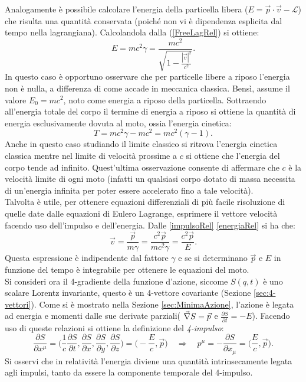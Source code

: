Analogamente è possibile calcolare l'energia della particella libera ($E = \vec{p}\cdot\vec{v}-\mathcal{L} $) che risulta una quantità conservata (poiché non vi è dipendenza esplicita dal tempo nella lagrangiana). Calcolandola dalla (\ref{FreeLagRel}) si ottiene:
\begin{equation}
    E = mc^2\gamma=\frac{mc^2}{\sqrt{1-\frac{|\vec{v}|^2}{c^2}}}.\label{energiaRel}
\end{equation}
In questo caso è opportuno osservare che per particelle libere a riposo l'energia non è nulla, a differenza di come accade in meccanica classica. Bensì, assume il valore $E_0=mc^2$, noto come energia a riposo della particella. Sottraendo all'energia totale del corpo il termine di energia a riposo si ottiene la quantità di energia esclusivamente dovuta al moto, ossia l'energia cinetica:
\begin{equation}
    T=mc^2\gamma-mc^2=mc^2(\gamma-1).
\end{equation}
Anche in questo caso studiando il limite classico si ritrova l'energia cinetica classica mentre nel limite di velocità prossime a $c$ si ottiene che l'energia del corpo tende ad infinito. Quest'ultima osservazione consente di affermare che $c$ è la velocità limite di ogni moto (infatti un qualsiasi corpo dotato di massa necessita di un'energia infinita per poter essere accelerato fino a tale velocità).\\

Talvolta è utile, per ottenere equazioni differenziali di più facile risoluzione di quelle date dalle equazioni di Eulero Lagrange, esprimere il vettore velocità facendo uso dell'impulso e dell'energia. Dalle \eqref{impulsoRel} \eqref{energiaRel} si ha che:
\begin{equation}
    \vec v=\frac{\vec p}{m\gamma}=\frac{c^2\vec p}{mc^2\gamma}=\frac{c^2\vec p}{E}.\label{velPE}
\end{equation}    
Questa espressione è indipendente dal fattore $\gamma$ e se si determinano $\vec p$ e $E$ in funzione del tempo è integrabile per ottenere le equazioni del moto.\\

Si consideri ora il 4-gradiente della funzione d'azione, siccome $S(q,t)$ è uno scalare Lorentz invariante, questo è un 4-vettore covariante (Sezione \ref{sec:4-vettori}). Come si è mostrato nella Sezione \ref{sec:MinimaAzione}, l'azione è legata ad energia e momenti dalle sue derivate parziali( $\vec{\nabla} S=\vec{p}$ e $\frac{\partial S }{\partial t}=-E$). Facendo uso di queste relazioni si ottiene la definizione del \emph{4-impulso}:
\begin{equation}
   \frac{\partial S}{\partial x^\mu}= \bigg(\frac{1}{c}\frac{\partial S }{\partial t},\frac{\partial S }{\partial x},\frac{\partial S }{\partial y},\frac{\partial S }{\partial z}\bigg)=\bigg(-\frac{E}{c},\vec{p}\bigg)\quad \Rightarrow \quad
   p^\mu=-\frac{\partial S }{\partial x_\mu}=\bigg(\frac{E}{c},\vec{p}\bigg).
\end{equation}
Si osservi che in relatività l'energia diviene una quantità intrinsecamente legata agli impulsi, tanto da essere la componente temporale del 4-impulso.\\

